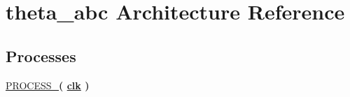 \hypertarget{classtheta__abc_1_1theta__abc}{}\section{theta\+\_\+abc Architecture Reference}
\label{classtheta__abc_1_1theta__abc}
\subsection*{Processes}
 \begin{DoxyCompactItemize}
\item 
\hyperlink{classtheta__abc_1_1theta__abc_a8ee64d1327298358d5f75867875249ca}{P\+R\+O\+C\+E\+S\+S\+\_}{\bfseries  ( {\bfseries {\bfseries \hyperlink{classtheta__abc_a4a4609c199d30b3adebbeb3a01276ec5}{clk}} \textcolor{vhdlchar}{ }} )}
\end{DoxyCompactItemize}
